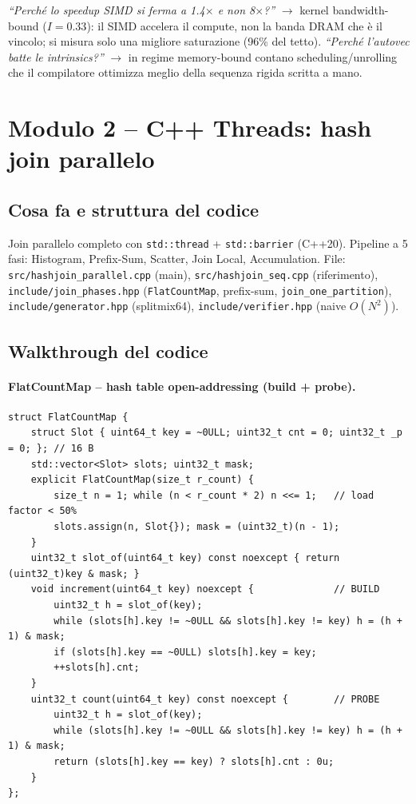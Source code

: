 \documentclass[11pt,a4paper]{article}
\begin{document}
\begin{qbox}[M1]
\emph{``Perché lo speedup SIMD si ferma a 1.4$\times$ e non 8$\times$?''} $\to$ kernel bandwidth-bound ($I=0.33$): il SIMD accelera il compute, non la banda DRAM che è il vincolo; si misura solo una migliore saturazione (96\% del tetto). \emph{``Perché l'autovec batte le intrinsics?''} $\to$ in regime memory-bound contano scheduling/unrolling che il compilatore ottimizza meglio della sequenza rigida scritta a mano.
\end{qbox}
\section{Modulo 2 -- C++ Threads: hash join parallelo}

\subsection{Cosa fa e struttura del codice}

Join parallelo completo con \texttt{std::thread} + \texttt{std::barrier} (C++20). Pipeline a 5 fasi: Histogram, Prefix-Sum, Scatter, Join Local, Accumulation. File: \texttt{src/hashjoin\_parallel.cpp} (main), \texttt{src/hashjoin\_seq.cpp} (riferimento), \texttt{include/join\_phases.hpp} (\texttt{FlatCountMap}, prefix-sum, \texttt{join\_one\_partition}), \texttt{include/generator.hpp} (splitmix64), \texttt{include/verifier.hpp} (naive $O(N^2)$).

\subsection{Walkthrough del codice}

\paragraph{FlatCountMap -- hash table open-addressing (build + probe).}
\begin{lstlisting}[style=cpp]
struct FlatCountMap {
    struct Slot { uint64_t key = ~0ULL; uint32_t cnt = 0; uint32_t _p = 0; }; // 16 B
    std::vector<Slot> slots; uint32_t mask;
    explicit FlatCountMap(size_t r_count) {
        size_t n = 1; while (n < r_count * 2) n <<= 1;   // load factor < 50%
        slots.assign(n, Slot{}); mask = (uint32_t)(n - 1);
    }
    uint32_t slot_of(uint64_t key) const noexcept { return (uint32_t)key & mask; }
    void increment(uint64_t key) noexcept {              // BUILD
        uint32_t h = slot_of(key);
        while (slots[h].key != ~0ULL && slots[h].key != key) h = (h + 1) & mask;
        if (slots[h].key == ~0ULL) slots[h].key = key;
        ++slots[h].cnt;
    }
    uint32_t count(uint64_t key) const noexcept {        // PROBE
        uint32_t h = slot_of(key);
        while (slots[h].key != ~0ULL && slots[h].key != key) h = (h + 1) & mask;
        return (slots[h].key == key) ? slots[h].cnt : 0u;
    }
};
\end{lstlisting}
\end{document}
